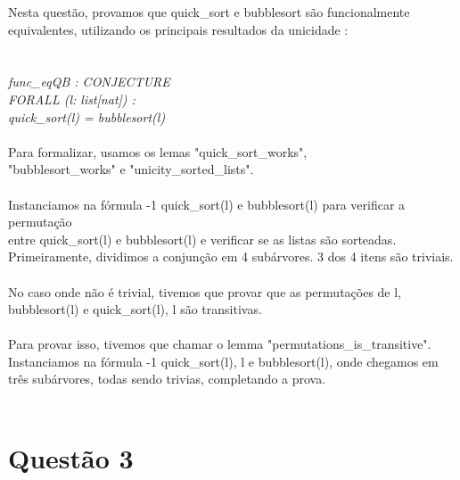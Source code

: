 \documentclass{article}
\begin{document}
Nesta questão, provamos que quick\_sort e bubblesort são funcionalmente equivalentes, utilizando os principais resultados da unicidade :\\
\\
\\
\textit{
func\_eqQB :  CONJECTURE\\
FORALL (l: list[nat]) :\\
 quick\_sort(l) = bubblesort(l)\\
}
\\
Para formalizar, usamos os lemas "quick\_sort\_works",\\
"bubblesort\_works" e "unicity\_sorted\_lists".\\
\\
Instanciamos na fórmula -1 quick\_sort(l) e bubblesort(l) para verificar a permutação \\
entre quick\_sort(l) e bubblesort(l) e verificar se as listas são sorteadas.\\

Primeiramente, dividimos a conjunção em 4 subárvores. 3 dos 4 itens são triviais. \\
\\
No caso onde não é trivial, tivemos que provar que as permutações de l, bubblesort(l) e quick\_sort(l), l são transitivas. \\
\\

Para provar isso, tivemos que chamar o lemma "permutations\_is\_transitive".\\


Instanciamos na fórmula -1 quick\_sort(l), l e bubblesort(l), onde chegamos em três subárvores, todas sendo trivias, completando a prova. \\

\\


\section{Questão 3}
\end{document}
